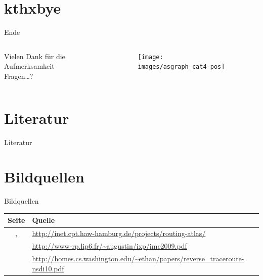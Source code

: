 \documentclass[ngerman,compress,svgnames,hyperref={bookmarks},final]{beamer}
\begin{document}
\section{kthxbye}
\begin{frame}[plain]{Ende}
\begin{columns}[t]
\begin{column}{0.5\textwidth}
 \begin{center}
 \vspace{1cm}
 Vielen Dank für die Aufmerksamkeit\\
 \vspace{1.5cm}
 Fragen\ldots?
 \end{center}
\end{column}
\begin{column}{0.5\textwidth}
 \vspace{-1cm}
 \begin{figure}
  \label{asngraphs2}
  \texttt{[image: images/asgraph\_cat4-pos]}
 \end{figure}
\end{column}
\end{columns}
\end{frame}

\section{Literatur}
\begin{frame}{Literatur}
\scriptsize


\end{frame}

\section{Bildquellen}
\begin{frame}[plain]{Bildquellen}
  \scriptsize
  \begin{table}
    \begin{tabular}{ c p{} }
      Seite & Quelle \\ \hline
      \pageref{asgraphs}, \pageref{asngraphs2} & \url{http://inet.cpt.haw-hamburg.de/projects/routing-atlas/}\\ \hline
      \pageref{augustin_ixp} & \url{http://www-rp.lip6.fr/~augustin/ixp/imc2009.pdf} \\ \hline
      \pageref{reverse_traceroute} & \url{http://homes.cs.washington.edu/~ethan/papers/reverse_traceroute-nsdi10.pdf} \\ \hline
    \end{tabular}
  \end{table}
\end{frame}
\end{document}
